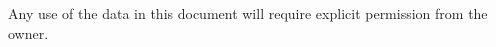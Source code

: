 \documentclass[
flagCMYK,
totpages,booktabs,
helvetica
]{europecv}
\def \spaziatura {19}
\begin{document}

Any use of the data in this document will require explicit permission from the owner.



%
\end{document}
